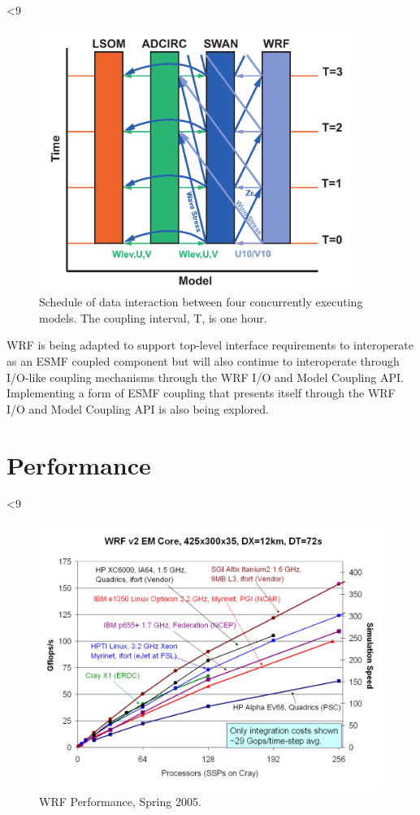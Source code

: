 %
%
\ifnum{}<9
\begin{figure}
  \centering
  \includegraphics[width=4in]{figures/coupling2.pdf}
  \caption{\label{figure:7}Schedule of data interaction between four concurrently executing
           models. The coupling interval, T, is one hour.}
\end{figure}
\fi

WRF is being adapted to support top-level interface requirements to
interoperate as an ESMF coupled component but will also continue to
interoperate through I/O-like coupling mechanisms through the WRF I/O
and Model Coupling API. Implementing a form of ESMF coupling that
presents itself through the WRF I/O and Model Coupling API is also
being explored.

\section{Performance}

%
%
\ifnum{}<9
\begin{figure}
  \centering
  \includegraphics[width=5in]{figures/performance.pdf}
  \caption{\label{figure:performance} WRF Performance, Spring 2005.}
\end{figure}
\fi

